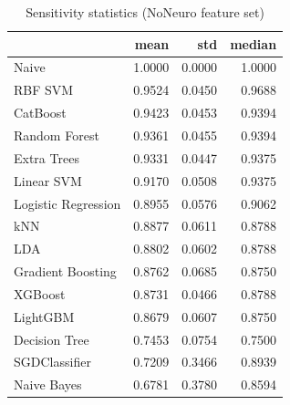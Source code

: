 \begin{table}
\caption{Sensitivity statistics (NoNeuro feature set)}
\label{tab:sensitivity_NoNeuro_stats}
\begin{tabular}{lrrr}
\toprule
 & mean & std & median \\
\midrule
Naive & 1.0000 & 0.0000 & 1.0000 \\
RBF SVM & 0.9524 & 0.0450 & 0.9688 \\
CatBoost & 0.9423 & 0.0453 & 0.9394 \\
Random Forest & 0.9361 & 0.0455 & 0.9394 \\
Extra Trees & 0.9331 & 0.0447 & 0.9375 \\
Linear SVM & 0.9170 & 0.0508 & 0.9375 \\
Logistic Regression & 0.8955 & 0.0576 & 0.9062 \\
kNN & 0.8877 & 0.0611 & 0.8788 \\
LDA & 0.8802 & 0.0602 & 0.8788 \\
Gradient Boosting & 0.8762 & 0.0685 & 0.8750 \\
XGBoost & 0.8731 & 0.0466 & 0.8788 \\
LightGBM & 0.8679 & 0.0607 & 0.8750 \\
Decision Tree & 0.7453 & 0.0754 & 0.7500 \\
SGDClassifier & 0.7209 & 0.3466 & 0.8939 \\
Naive Bayes & 0.6781 & 0.3780 & 0.8594 \\
\bottomrule
\end{tabular}
\end{table}
